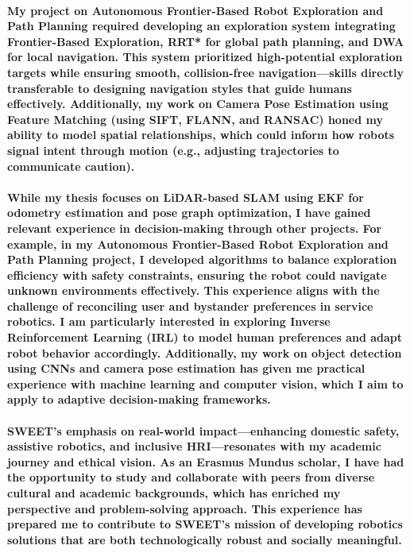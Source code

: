 \paragraph{\textnormal{
My project on Autonomous Frontier-Based Robot Exploration and Path Planning required developing an exploration system integrating Frontier-Based Exploration, RRT* for global path planning, and DWA for local navigation. This system prioritized high-potential exploration targets while ensuring smooth, collision-free navigation—skills directly transferable to designing navigation styles that guide humans effectively. Additionally, my work on Camera Pose Estimation using Feature Matching (using SIFT, FLANN, and RANSAC) honed my ability to model spatial relationships, which could inform how robots signal intent through motion (e.g., adjusting trajectories to communicate caution).
}}

\paragraph{
\textnormal{
While my thesis focuses on LiDAR-based SLAM using EKF for odometry estimation and pose graph optimization, I have gained relevant experience in decision-making through other projects. For example, in my Autonomous Frontier-Based Robot Exploration and Path Planning project, I developed algorithms to balance exploration efficiency with safety constraints, ensuring the robot could navigate unknown environments effectively. This experience aligns with the challenge of reconciling user and bystander preferences in service robotics. I am particularly interested in exploring Inverse Reinforcement Learning (IRL) to model human preferences and adapt robot behavior accordingly. Additionally, my work on object detection using CNNs and camera pose estimation has given me practical experience with machine learning and computer vision, which I aim to apply to adaptive decision-making frameworks.
}}

\paragraph{\textnormal{
SWEET’s emphasis on real-world impact—enhancing domestic safety, assistive robotics, and inclusive HRI—resonates with my academic journey and ethical vision. As an Erasmus Mundus scholar, I have had the opportunity to study and collaborate with peers from diverse cultural and academic backgrounds, which has enriched my perspective and problem-solving approach. This experience has prepared me to contribute to SWEET’s mission of developing robotics solutions that are both technologically robust and socially meaningful.
}}


